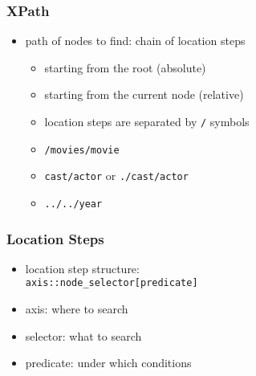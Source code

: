 \documentclass[dvipsnames]{beamer}
\theoremstyle{plain}
\begin{document}
\begin{frame}
  \frametitle{XPath}

  \begin{itemize}
    \item path of nodes to find: chain of location steps
    \begin{itemize}
      \item starting from the root (absolute)
      \item starting from the current node (relative)

      \medskip
      \item location steps are separated by \lstinline!/! symbols
    \end{itemize}

    \pause
    \begin{example}
      \begin{itemize}
       \item \lstinline!/movies/movie!
       \item \lstinline!cast/actor! or \lstinline!./cast/actor!
       \item \lstinline!../../year!
      \end{itemize}
    \end{example}
  \end{itemize}
\end{frame}

\begin{frame}
  \frametitle{Location Steps}

  \begin{itemize}
    \item location step structure:\\
      \lstinline!axis::node_selector[predicate]!

    \pause
    \medskip
    \item axis: where to search
    \item selector: what to search
    \item predicate: under which conditions
  \end{itemize}
\end{frame}
\end{document}
